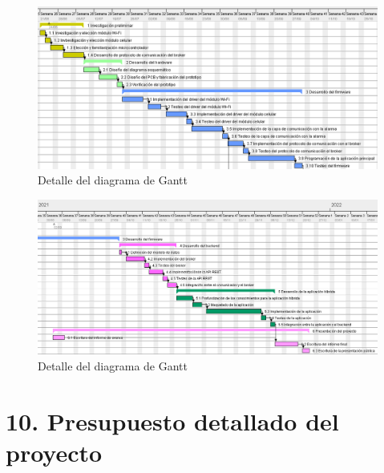 \documentclass[
11pt, %
codirector, %
]{charter}
\begin{document}
\begin{figure}[htpb]
\centering 
\includegraphics[width=\textwidth]{./Figuras/gantt2.png}
\caption{Detalle del diagrama de Gantt}
\label{fig:gantt2}
\end{figure}

\begin{figure}[htpb]
\centering 
\includegraphics[width=\textwidth]{./Figuras/gantt3.png}
\caption{Detalle del diagrama de Gantt}
\label{fig:gantt3}
\end{figure}



\section{10. Presupuesto detallado del proyecto}
\label{sec:presupuesto}



\end{document}
